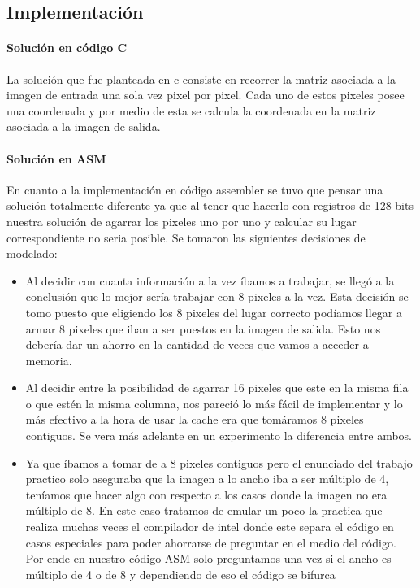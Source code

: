 \subsection{Implementación}
\paragraph{Solución en código C}
La solución que fue planteada en c consiste en recorrer la matriz asociada a la imagen de entrada una sola vez pixel por pixel. Cada uno de estos pixeles posee una coordenada y por medio de esta se calcula la coordenada en la matriz asociada a la imagen de salida. 


\paragraph{Solución en ASM}
En cuanto a la implementación en código assembler se tuvo que pensar una solución totalmente diferente ya que al tener que hacerlo con registros de 128 bits nuestra solución de agarrar los pixeles uno por uno y calcular su lugar correspondiente no seria posible. Se tomaron las siguientes decisiones de modelado:
\begin{itemize}
	\item Al decidir con cuanta información a la vez íbamos a trabajar, se llegó a la conclusión que lo mejor sería trabajar con 8 pixeles a la vez. Esta decisión se tomo puesto que eligiendo los 8 pixeles del lugar correcto podíamos llegar a armar 8 pixeles que iban a ser puestos en la imagen de salida. Esto nos debería dar un ahorro en la cantidad de veces que vamos a acceder a memoria.

	\item Al decidir entre la posibilidad de agarrar 16 pixeles que este en la misma fila o que estén la misma columna, nos pareció lo más fácil de implementar y lo más efectivo a la hora de usar la cache era que tomáramos 8 pixeles contiguos. Se vera más adelante en un experimento la diferencia entre ambos.

	\item Ya que íbamos a tomar de a 8 pixeles contiguos pero el enunciado del trabajo practico solo aseguraba que la imagen a lo ancho iba a ser múltiplo de 4, teníamos que hacer algo con respecto a los casos donde la imagen no era múltiplo de 8. En este caso tratamos de emular un poco la practica que realiza muchas veces el compilador de intel donde este separa el código en casos especiales para poder ahorrarse de preguntar en el medio del código. Por ende en nuestro código ASM solo preguntamos una vez si el ancho es múltiplo de 4 o de 8 y dependiendo de eso el código se bifurca
\end{itemize}

